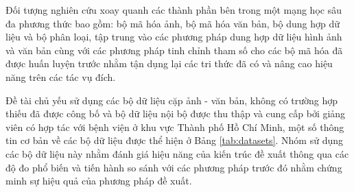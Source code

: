 \begin{refsection}
Đối tượng nghiên cứu xoay quanh các thành phần bên trong một mạng học sâu đa phương thức bao gồm: bộ mã hóa ảnh, bộ mã hóa văn bản, bộ dung hợp dữ liệu và bộ phân loại, tập trung vào các phương pháp dung hợp dữ liệu hình ảnh và văn bản cùng với các phương pháp tinh chỉnh tham số cho các bộ mã hóa đã được huấn luyện trước nhằm tận dụng lại các tri thức đã có và nâng cao hiệu năng trên các tác vụ đích.

Đề tài chủ yếu sử dụng các bộ dữ liệu cặp ảnh - văn bản, không có trường hợp thiếu đã được công bố và bộ dữ liệu nội bộ được thu thập và cung cấp bởi giảng viên có hợp tác với bệnh viện ở khu vực Thành phố Hồ Chí Minh, một số thông tin cơ bản về các bộ dữ liệu được thể hiện ở Bảng \ref{tab:datasets}. Nhóm sử dụng các bộ dữ liệu này nhằm đánh giá hiệu năng của kiến trúc đề xuất thông qua các độ đo phổ biến và tiến hành so sánh với các phương pháp trước đó nhằm chứng minh sự hiệu quả của phương pháp đề xuất.


\end{refsection}
